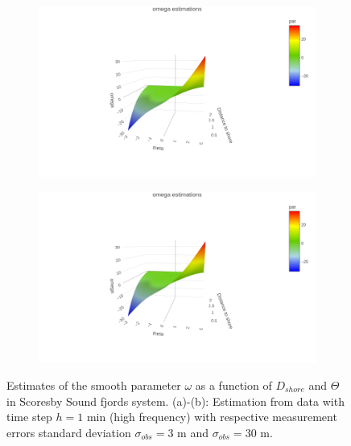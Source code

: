 \documentclass[11pt]{article}
\newcommand {\1}{\mathbb{1}}
\begin{document}
\begin{figure}[H]
	\centering
	\begin{subfigure}{0.48\textwidth}
		\centering
		\includegraphics[scale=0.3]{images/simulation study/omega_crcvm_fjords_hf_ne1.png}
		\caption{}
	\end{subfigure}
	\begin{subfigure}{0.48\textwidth}
		\centering
		\includegraphics[scale=0.3]{images/simulation study/omega_crcvm_fjords_hf_ne1.png}
		\caption{}
	\end{subfigure}
	\caption{Estimates of the smooth parameter $\omega$ as a function of $D_{shore}$ and $\Theta$ in Scoresby Sound fjords system. (a)-(b): Estimation from data with time step $h=1$ min (high frequency) with respective measurement errors standard deviation $\sigma_{obs}=3$ m and $\sigma_{obs}=30$ m.}
	\label{fig: estimate_fjords_CRCVM}
\end{figure}
\end{document}
